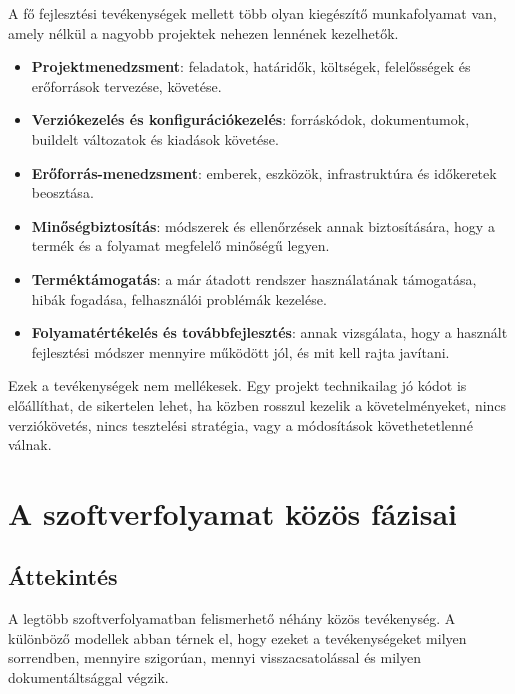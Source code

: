 A fő fejlesztési tevékenységek mellett több olyan kiegészítő munkafolyamat van, amely nélkül a nagyobb projektek nehezen lennének kezelhetők.

\begin{itemize}
  \item \textbf{Projektmenedzsment}: feladatok, határidők, költségek, felelősségek és erőforrások tervezése, követése.
  \item \textbf{Verziókezelés és konfigurációkezelés}: forráskódok, dokumentumok, buildelt változatok és kiadások követése.
  \item \textbf{Erőforrás-menedzsment}: emberek, eszközök, infrastruktúra és időkeretek beosztása.
  \item \textbf{Minőségbiztosítás}: módszerek és ellenőrzések annak biztosítására, hogy a termék és a folyamat megfelelő minőségű legyen.
  \item \textbf{Terméktámogatás}: a már átadott rendszer használatának támogatása, hibák fogadása, felhasználói problémák kezelése.
  \item \textbf{Folyamatértékelés és továbbfejlesztés}: annak vizsgálata, hogy a használt fejlesztési módszer mennyire működött jól, és mit kell rajta javítani.
\end{itemize}

Ezek a tevékenységek nem mellékesek. Egy projekt technikailag jó kódot is előállíthat, de sikertelen lehet, ha közben rosszul kezelik a követelményeket, nincs verziókövetés, nincs tesztelési stratégia, vagy a módosítások követhetetlenné válnak.

\section{A szoftverfolyamat közös fázisai}

\subsection{Áttekintés}

A legtöbb szoftverfolyamatban felismerhető néhány közös tevékenység. A különböző modellek abban térnek el, hogy ezeket a tevékenységeket milyen sorrendben, mennyire szigorúan, mennyi visszacsatolással és milyen dokumentáltsággal végzik.

\begin{center}

\end{center}




